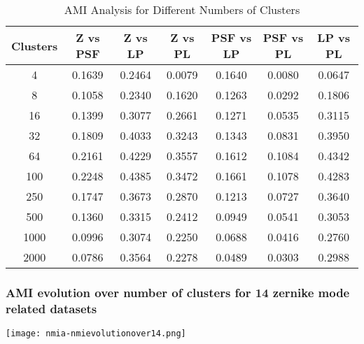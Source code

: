 \begin{table}[h!]
\centering
\begin{tabular}{|c|c|c|c|c|c|c|}
\hline
\textbf{Clusters} & \textbf{Z vs PSF} & \textbf{Z vs LP} & \textbf{Z vs PL} & \textbf{PSF vs LP} & \textbf{PSF vs PL} & \textbf{LP vs PL} \\
\hline
4  & 0.1639 & 0.2464 & 0.0079 & 0.1640 & 0.0080 & 0.0647 \\
8  & 0.1058 & 0.2340 & 0.1620 & 0.1263 & 0.0292 & 0.1806 \\
16 & 0.1399 & 0.3077 & 0.2661 & 0.1271 & 0.0535 & 0.3115 \\
32 & 0.1809 & 0.4033 & 0.3243 & 0.1343 & 0.0831 & 0.3950 \\
64 & 0.2161 & 0.4229 & 0.3557 & 0.1612 & 0.1084 & 0.4342 \\
100 & 0.2248 & 0.4385 & 0.3472 & 0.1661 & 0.1078 & 0.4283 \\
250 & 0.1747 & 0.3673 & 0.2870 & 0.1213 & 0.0727 & 0.3640 \\
500 & 0.1360 & 0.3315 & 0.2412 & 0.0949 & 0.0541 & 0.3053 \\
1000 & 0.0996 & 0.3074 & 0.2250 & 0.0688 & 0.0416 & 0.2760 \\
2000 & 0.0786 & 0.3564 & 0.2278 & 0.0489 & 0.0303 & 0.2988 \\
\hline
\end{tabular}
\caption{AMI Analysis for Different Numbers of Clusters}
\end{table}

		\FloatBarrier
		
	\subsubsection{AMI evolution over number of clusters for 14 zernike mode related datasets}
		\begin{figure*}[ht!]
			\centering
			\texttt{[image: nmia-nmievolutionover14.png]}
		\end{figure*}
		
